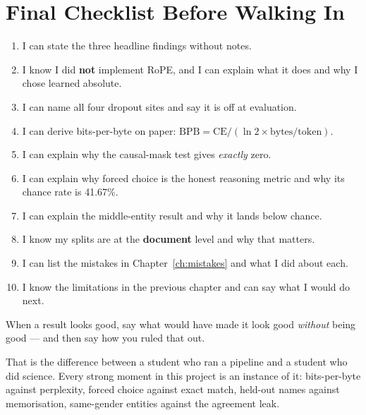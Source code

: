 \documentclass[11pt]{report}
\begin{document}
\chapter{Final Checklist Before Walking In}

\begin{enumerate}[leftmargin=*]
\item I can state the three headline findings without notes.
\item I know I did \textbf{not} implement RoPE, and I can explain what it does
      and why I chose learned absolute.
\item I can name all four dropout sites and say it is off at evaluation.
\item I can derive bits-per-byte on paper:
      $\mathrm{BPB} = \mathrm{CE} / (\ln 2 \times \text{bytes/token})$.
\item I can explain why the causal-mask test gives \emph{exactly} zero.
\item I can explain why forced choice is the honest reasoning metric and why its
      chance rate is 41.67\%.
\item I can explain the middle-entity result and why it lands below chance.
\item I know my splits are at the \textbf{document} level and why that matters.
\item I can list the mistakes in Chapter~\ref{ch:mistakes} and what I did about
      each.
\item I know the limitations in the previous chapter and can say what I would do
      next.
\end{enumerate}

\vspace{1cm}
\begin{center}
\begin{tcolorbox}[colback=conceptgreen!8,colframe=conceptgreen,width=0.88\textwidth,
  title={\textbf{The single most important habit}}]
When a result looks good, say what would have made it look good \emph{without}
being good --- and then say how you ruled that out.

That is the difference between a student who ran a pipeline and a student who
did science. Every strong moment in this project is an instance of it:
bits-per-byte against perplexity, forced choice against exact match, held-out
names against memorisation, same-gender entities against the agreement leak.
\end{tcolorbox}
\end{center}
\end{document}
